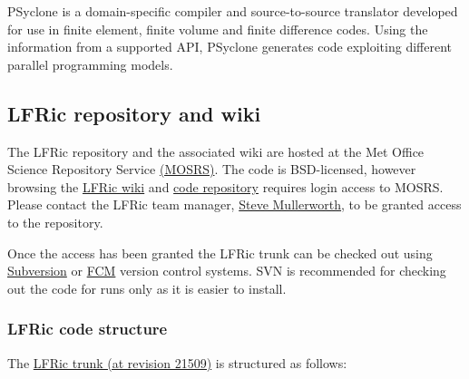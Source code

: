 \documentclass[twoside,a4paper,12pt]{article}
\begin{document}
PSyclone is a domain-specific compiler and source-to-source translator developed
for use in finite element, finite volume and finite difference codes. Using the
information from a supported API, PSyclone generates code exploiting different
parallel programming models.
%
%
\subsection{LFRic repository and wiki}\label{lfric_repo}

The LFRic repository and the associated wiki are hosted at the Met Office
Science Repository Service \href{https://code.metoffice.gov.uk/trac/home}{(MOSRS)}.
The code is BSD-licensed, however browsing the
\href{https://code.metoffice.gov.uk/trac/lfric/wiki}{LFRic wiki} and
\href{https://code.metoffice.gov.uk/trac/lfric/browser}{code repository}
requires login access to MOSRS. Please contact the LFRic team manager,
\href{mailto:steve.mullerworth@metoffice.gov.uk}{Steve Mullerworth},
to be granted access to the repository.

Once the access has been granted the LFRic trunk can be checked out using
\href{https://subversion.apache.org/}{Subversion} or
\href{https://metomi.github.io/fcm/doc/}{FCM} version control systems.
SVN is recommended for checking out the code for runs only as it is easier
to install.
%
%
\subsubsection{LFRic code structure}\label{lfric_code}

The \href{https://code.metoffice.gov.uk/trac/lfric/browser/LFRic/trunk?rev=21509}{LFRic trunk (at revision 21509)}
is structured as follows:
\end{document}
